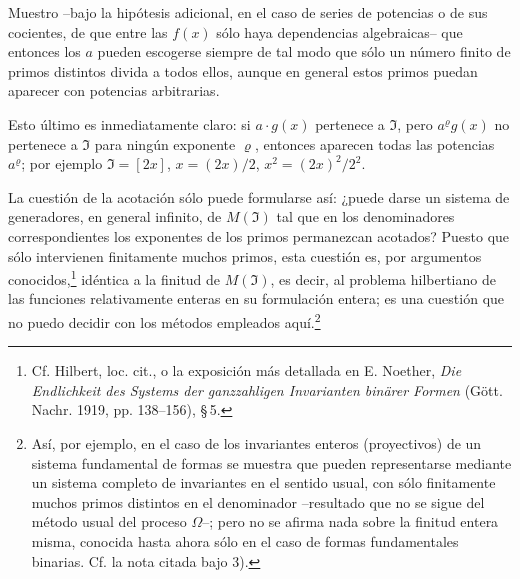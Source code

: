 Muestro --bajo la hipótesis adicional, en el caso de series de potencias o de sus cocientes, de que entre las $f(x)$ sólo haya dependencias algebraicas-- que entonces los $a$ pueden escogerse siempre de tal modo que sólo un número finito de primos distintos divida a todos ellos, aunque en general estos primos puedan aparecer con potencias arbitrarias.

Esto último es inmediatamente claro: si $a\cdot g(x)$ pertenece a $\mathfrak{I}$, pero $a^\varrho g(x)$ no pertenece a $\mathfrak{I}$ para ningún exponente $\varrho$, entonces aparecen todas las potencias $a^\varrho$; por ejemplo $\mathfrak{I}=[2x]$, $x=(2x)/2$, $x^2=(2x)^2/2^2$.

La cuestión de la acotación sólo puede formularse así: ¿puede darse un sistema de generadores, en general infinito, de $M(\mathfrak{I})$ tal que en los denominadores correspondientes los exponentes de los primos permanezcan acotados? Puesto que sólo intervienen finitamente muchos primos, esta cuestión es, por argumentos conocidos,\footnote{Cf. Hilbert, loc. cit., o la exposición más detallada en E. Noether, \emph{Die Endlichkeit des Systems der ganzzahligen Invarianten binärer Formen} (Gött. Nachr. 1919, pp. 138--156), \S\,5.} idéntica a la finitud de $M(\mathfrak{I})$, es decir, al problema hilbertiano de las funciones relativamente enteras en su formulación entera; es una cuestión que no puedo decidir con los métodos empleados aquí.\footnote{Así, por ejemplo, en el caso de los invariantes enteros (proyectivos) de un sistema fundamental de formas se muestra que pueden representarse mediante un sistema completo de invariantes en el sentido usual, con sólo finitamente muchos primos distintos en el denominador --resultado que no se sigue del método usual del proceso $\Omega$--; pero no se afirma nada sobre la finitud entera misma, conocida hasta ahora sólo en el caso de formas fundamentales binarias. Cf. la nota citada bajo 3).}

